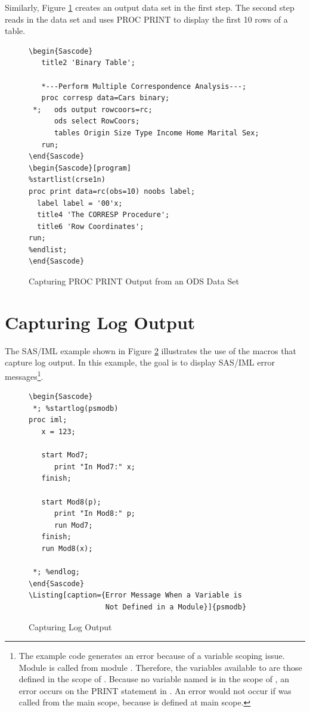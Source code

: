 \documentclass[article,oneside]{memoir}
\begin{document}
  Similarly, Figure \ref{printods} creates an output data set in the first step.
  The second step reads in the data set and uses PROC PRINT to display
  the first 10 rows of a table.

\begin{figure}[H]
\begin{snugshade}
\begin{verbatim}
\begin{Sascode}
   title2 'Binary Table';

   *---Perform Multiple Correspondence Analysis---;
   proc corresp data=Cars binary;
 *;   ods output rowcoors=rc;
      ods select RowCoors;
      tables Origin Size Type Income Home Marital Sex;
   run;
\end{Sascode}
\begin{Sascode}[program]
%startlist(crse1n)
proc print data=rc(obs=10) noobs label;
  label label = '00'x;
  title4 'The CORRESP Procedure';
  title6 'Row Coordinates';
run;
%endlist;
\end{Sascode}
\end{verbatim}
\end{snugshade}
\caption{Capturing PROC PRINT Output from an ODS Data Set}\label{printods}
\end{figure}

\section{Capturing Log Output}

  The SAS/IML example shown in Figure \ref{logout} illustrates
  the use of the macros that capture log output. In this example, the goal is to
  display SAS/IML error messages\footnote{The example code generates an error because
  of a variable scoping issue.
  Module  is called from module . Therefore, the variables
  available to  are those defined in the scope of .
  Because no variable named  is in the  scope of ,
  an error occurs on the PRINT statement in .
  An error would not occur if  was called from the main scope,
  because  is defined at main scope.}.

\begin{figure}[H]
\begin{snugshade}
\begin{verbatim}
\begin{Sascode}
 *; %startlog(psmodb)
proc iml;
   x = 123;

   start Mod7;
      print "In Mod7:" x;
   finish;

   start Mod8(p);
      print "In Mod8:" p;
      run Mod7;
   finish;
   run Mod8(x);

 *; %endlog;
\end{Sascode}
\Listing[caption={Error Message When a Variable is
                  Not Defined in a Module}]{psmodb}
\end{verbatim}
\end{snugshade}
\caption{Capturing Log Output}\label{logout}
\end{figure}
\end{document}
